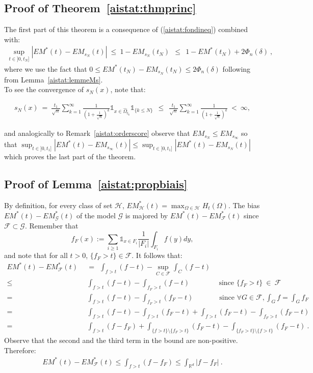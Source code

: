 \subsection*{Proof of Theorem~\ref{aistat:thmprinc}}
\noindent
The first part of this theorem is a consequence of (\ref{aistat:fondineq}) combined with:
\begin{align*}
\sup_{t \in ]0,t_N]} |EM^*(t)-EM_{s_N}(t)| ~\le~ 1-EM_{s_N}(t_N) ~~\le~~ 1-EM^*(t_N)+2\Phi_n(\delta)~,
\end{align*} 
where we use the fact that $0 \le EM^*(t_N)-EM_{s_N}(t_N) \le 2 \Phi_n(\delta)$ following from Lemma~\ref{aistat:lemmeMs}.\\
\noindent To see the convergence of $s_N(x)$, note that:

\begin{align*}
s_N(x)~=~\frac{t_1}{\sqrt n} \sum_{k=1}^{\infty}\frac{1}{(1+\frac{1}{\sqrt n})^k} \mathds{1}_{x \in \hat \Omega_{t_k}} \mathds{1}_{\{k \le N\}}~~\le~~ \frac{t_1}{\sqrt n} \sum_{k=1}^{\infty} \frac{1}{(1+\frac{1}{\sqrt n})^k} ~<~ \infty,
\end{align*}

and analogically to Remark~\ref{aistat:orderscore} observe that $EM_{s_N} \le EM_{s_\infty}$ so that $\sup_{t \in ]0,t_1]} |EM^*(t)-EM_{s_\infty}(t)| \leq \sup_{t \in ]0,t_1]} |EM^*(t)-EM_{s_N}(t)|$ which proves the last part of the theorem.

\subsection*{Proof of Lemma~\ref{aistat:propbiais}}

By definition, for every class of set $\mathcal{H}$, $EM_{\mathcal{H}}^*(t)=\max_{\Omega \in \mathcal{H}}H_t(\Omega)$.
The bias $ EM^*(t)-EM^*_{\mathcal{G}}(t)$ of the model $\mathcal{G}$ is majored by $ EM^*(t)-EM^*_{\mathcal{F}}(t)$ since $\mathcal{F} \subset \mathcal{G}$.
\noindent Remember that $$f_{F}(x) := \sum_{i \ge 1} \mathds{1}_{x \in F_i} \frac{1}{|F_i|} \int_{F_i}f(y)dy,$$ and note that for all $t>0$, $\{ f_{F} > t \} \in \mathcal{F}$. It follows that:
\begin{align*}
EM^*(t)-EM^*_{\mathcal{F}}(t) &~~=~~ \int_{f>t}(f-t)- \sup_{C \in \mathcal{F} }\int_{C}(f-t) \\
\le&~~ \int_{f>t}(f-t)- \int_{f_{F} > t}(f-t) ~~~~~~~~~~~~~~~~~\mbox{~since~} \{f_{F} > t\} ~\in~ \mathcal{F}  \\
=&~~\int_{f>t}(f-t)- \int_{f_{F} > t}(f_{F}-t) ~~~~~~~~~~~~~~~\mbox{~since~} \forall G \in \mathcal{F}, \int_Gf=\int_Gf_{F}\\
=&~~\int_{f>t}(f-t)-\int_{f>t}(f_{F}-t)+\int_{f>t}(f_{F}-t)-\int_{f_{F} > t}(f_{F}-t)\\
=&~~\int_{f>t}(f-f_{F})+\int_{\{f>t\}\setminus \{f_{F}>t\}}(f_{F}-t)-\int_{\{f_{F}>t\} \setminus \{f>t\}}(f_{F}-t)~.
\end{align*}
\noindent Observe that the second and the third term in the bound are non-positive. Therefore:
\begin{align*}
EM^*(t)-EM^*_{\mathcal{F}}(t) \le \int_{f>t}(f-f_{F}) \le \int_{\mathbb{R}^d}|f-f_{F}|~.
\end{align*}
